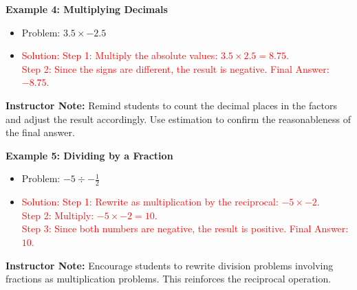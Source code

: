 \documentclass[11pt]{article}
\begin{document}
\begin{tcolorbox}[colframe=black!60, colback=white, 
coltitle=black, colbacktitle=black!15, fonttitle=\bfseries\Large, 
title=Examples (Part 2), halign title=center, left=10pt, right=10pt, top=10pt, bottom=5pt]

\textbf{Example 4: Multiplying Decimals}
\begin{itemize}
    \item Problem: \( 3.5 \times -2.5 \)
    \item \textcolor{red}{Solution: Step 1: Multiply the absolute values: \( 3.5 \times 2.5 = 8.75 \). \\ 
    Step 2: Since the signs are different, the result is negative. Final Answer: \( -8.75 \).}
\end{itemize}

{\color{blue} \textbf{Instructor Note:} Remind students to count the decimal places in the factors and adjust the result accordingly. Use estimation to confirm the reasonableness of the final answer.}

\textbf{Example 5: Dividing by a Fraction}
\begin{itemize}
    \item Problem: \( -5 \div -\frac{1}{2} \)
    \item \textcolor{red}{Solution: Step 1: Rewrite as multiplication by the reciprocal: \( -5 \times -2 \). \\ 
    Step 2: Multiply: \( -5 \times -2 = 10 \). \\ 
    Step 3: Since both numbers are negative, the result is positive. Final Answer: \( 10 \).}
\end{itemize}

{\color{blue} \textbf{Instructor Note:} Encourage students to rewrite division problems involving fractions as multiplication problems. This reinforces the reciprocal operation.}
\end{tcolorbox}


\vspace{1em}
\end{document}
